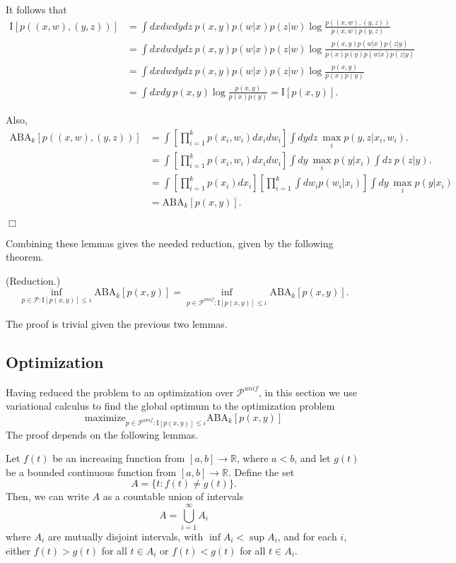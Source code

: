 \documentclass[12pt]{article}
\begin{document}
It follows that
\begin{align*}
\text{I}[p((x,w), (y,z))] &= \int dx dw dy dz  \ p(x,y)p(w|x)p(z|w) \log \frac{p((x,w), (y,z))}{p(x,w)p(y,z)}
\\&= \int dx dw dy dz \ p(x,y)p(w|x)p(z|w) \log \frac{p(x, y)p(w|x)p(z|y)}{p(x)p(y)p(w|x)p(z|y)}
\\&= \int dx dw dy dz \ p(x,y)p(w|x)p(z|w) \log \frac{p(x, y)}{p(x)p(y)}
\\&= \int dx dy \ p(x,y) \log \frac{p(x, y)}{p(x)p(y)} = \text{I}[p(x,y)].
\end{align*}

Also,
\begin{align*}
\text{ABA}_k[p((x,w),(y,z))] 
&= \int \left[\prod_{i=1}^k p(x_i, w_i) dx_i dw_i \right] \int dy dz \ \max_i p(y,z|x_i, w_i).
\\&= \int \left[\prod_{i=1}^k p(x_i, w_i) dx_i dw_i \right] \int dy \ \max_i p(y|x_i) \int dz \ p(z|y).
\\&= \int \left[\prod_{i=1}^k p(x_i) dx_i \right] \left[\prod_{i=1}^k \int dw_i p(w_i|x_i)\right] \int dy \ \max_i p(y|x_i)
\\&= \text{ABA}_k[p(x,y)].
\end{align*}

$\Box$


Combining these lemmas gives the needed reduction, given by the following theorem.

\begin{theorem}\label{theorem:reduction} (Reduction.)
\[
\inf_{p \in \mathcal{P}: \text{I}[p(x,y)] \leq \iota} \text{ABA}_k[p(x,y)] = 
\inf_{p \in \mathcal{P}^{unif}: \text{I}[p(x,y)] \leq \iota} \text{ABA}_k[p(x,y)].
\]
\end{theorem}

The proof is trivial given the previous two lemmas.

\subsection{Optimization}

Having reduced the problem to an optimization over $\mathcal{P}^{unif}$,
in this section we use variational calculus to find the global optimum to the optimization problem
\[
\text{maximize}_{p \in \mathcal{P}^{unif}: \text{I}[p(x,y)] \leq \iota} \text{ABA}_k[p(x,y)]
\]
The proof depends on the following lemmas.

\begin{lemma}\label{lemma:technical1}
Let $f(t)$ be an increasing function from $[a, b] \to \mathbb{R}$, where $a < b$,
and let $g(t)$ be a bounded continuous function from $[a, b] \to \mathbb{R}$.
Define the set
\[
A = \{t: f(t) \neq g(t)\}.
\]
Then, we can write $A$ as a countable union of intervals
\[
A = \bigcup_{i=1}^\infty A_i
\]
where $A_i$ are mutually disjoint intervals, with $\inf A_i < \sup
A_i$, and for each $i$, either $f(t) > g(t)$ for all $t \in A_i$ or
$f(t) < g(t)$ for all $t \in A_i$.
\end{lemma}
\end{document}
